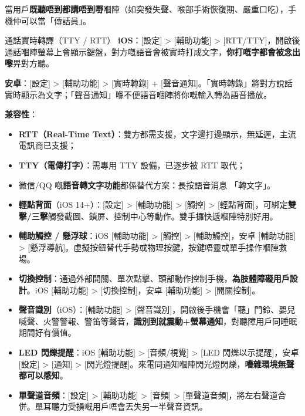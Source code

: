 
當用戶\textbf{既聽唔到都講唔到嘢}嗰陣（如突發失聲、喉部手術恢復期、嚴重口吃），手機仲可以當「傳話員」。

\begin{tcbinfo}{通話實時轉譯（TTY / RTT）}
\textbf{iOS}：[設定] > [輔助功能] > [RTT/TTY]，開啟後通話嗰陣螢幕上會顯示鍵盤，對方嘅語音會被實時打成文字，\textbf{你打嘅字都會被念出嚟}畀對方聽。

\textbf{安卓}：[設定] > [輔助功能] > [實時轉錄] + [聲音通知]。「實時轉錄」將對方說話實時顯示為文字；「聲音通知」喺不便語音嗰陣將你嘅輸入轉為語音播放。

\textbf{兼容性}：

\begin{itemize}
  \item \textbf{RTT（Real-Time Text）}：雙方都需支援，文字邊打邊顯示，無延遲，主流電訊商已支援；
  \item \textbf{TTY（電傳打字）}：需專用 TTY 設備，已逐步被 RTT 取代；
  \item 微信/QQ 嘅\textbf{語音轉文字功能}都係替代方案：長按語音消息 「轉文字」。
\end{itemize}

\end{tcbinfo}


\begin{itemize}
  \item \textbf{輕點背面}（iOS 14+）：[設定] > [輔助功能] > [觸控] > [輕點背面]，可綁定\textbf{雙擊/三擊}觸發截圖、鎖屏、控制中心等動作。雙手攞快遞嗰陣特別好用。
  \item \textbf{輔助觸控 / 懸浮球}：iOS [輔助功能] > [觸控] > [輔助觸控]，安卓 [輔助功能] > [懸浮導航]。虛擬按鈕替代手勢或物理按鍵，按鍵唔靈或單手操作嗰陣救場。
  \item \textbf{切換控制}：通過外部開關、單次點擊、頭部動作控制手機，\textbf{為肢體障礙用戶設計}。iOS [輔助功能] > [切換控制]，安卓 [輔助功能] > [開關控制]。
  \item \textbf{聲音識別}（iOS）：[輔助功能] > [聲音識別]，開啟後手機會「聽」門鈴、嬰兒喊聲、火警警報、警笛等聲音，\textbf{識別到就震動+螢幕通知}，對聽障用戶同睡眠期間好有價值。
  \item \textbf{LED 閃爍提醒}：iOS [輔助功能] > [音頻/視覺] > [LED 閃爍以示提醒]，安卓 [設定] > [通知] > [閃光燈提醒]。來電同通知嗰陣閃光燈閃爍，\textbf{嘈雜環境無聲都可以感知}。
  \item \textbf{單聲道音頻}：[設定] > [輔助功能] > [音頻] > [單聲道音頻]，將左右聲道合併。單耳聽力受損嘅用戶唔會丟失另一半聲音資訊。
\end{itemize}

